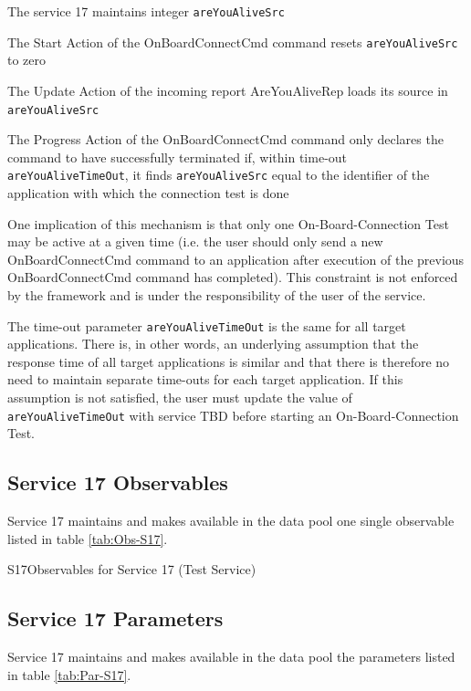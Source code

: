 \documentclass[a4paper,10pt]{article}
\newenvironment{fw_itemize}						%
{\begin{itemize}
  \setlength{\itemsep}{1mm}
  \setlength{\parskip}{0pt}
  \setlength{\parsep}{0pt}}
{\end{itemize}}
\newenvironment{cr_obs}[2]
{
\begin{longtable}{|l|p{9.5cm}|}
\caption{#2}\label{tab:Obs-#1} \\
\hline
\rowcolor{light-gray}
\textbf{Name} & \textbf{Description}\\
\hline\hline
\endfirsthead
\rowcolor{light-gray}
\textbf{Name} & \textbf{Description}\\
\hline\hline
\endhead
\DTLforeach*[\DTLiseq{\cat}{#1}]{dbObs}{\cat=Category,\name=Name,\desc=Desc}
{\DTLiffirstrow{}{\\\hline}\texttt{\name} & \desc}\\\hline
}
{\end{longtable}}
\begin{document}
\begin{fw_itemize}
\item The service 17 maintains integer \texttt{areYouAliveSrc}
\item The Start Action of the OnBoardConnectCmd command resets \texttt{areYouAliveSrc} to zero
\item The Update Action of the incoming report AreYouAliveRep loads its source in \texttt{areYouAliveSrc}
\item The Progress Action of the OnBoardConnectCmd command only declares the command to have successfully terminated if, within time-out \texttt{areYouAliveTimeOut}, it finds \texttt{areYouAliveSrc} equal to the identifier of the application with which the connection test is done
\end{fw_itemize}

One implication of this mechanism is that only one On-Board-Connection Test may be active at a given time (i.e. the user should only send a new OnBoardConnectCmd command to an application after execution of the previous OnBoardConnectCmd command has completed). This constraint is not enforced by the framework and is under the responsibility of the user of the service.

The time-out parameter \texttt{areYouAliveTimeOut} is the same for all target applications. There is, in other words, an underlying assumption that the response time of all target applications is similar and that there is therefore no need to maintain separate time-outs for each target application. If this assumption is not satisfied, the user must update the value of \texttt{areYouAliveTimeOut} with service TBD before starting an On-Board-Connection Test.



\subsection{Service 17 Observables}\label{sec:serv17Obs}
Service 17 maintains and makes available in the data pool one single observable listed in table \ref{tab:Obs-S17}.

\begin{cr_obs}{S17}{Observables for Service 17 (Test Service)}
\end{cr_obs}

\subsection{Service 17 Parameters}\label{sec:serv17Par}
Service 17 maintains and makes available in the data pool the parameters listed in table \ref{tab:Par-S17}.
\end{document}
